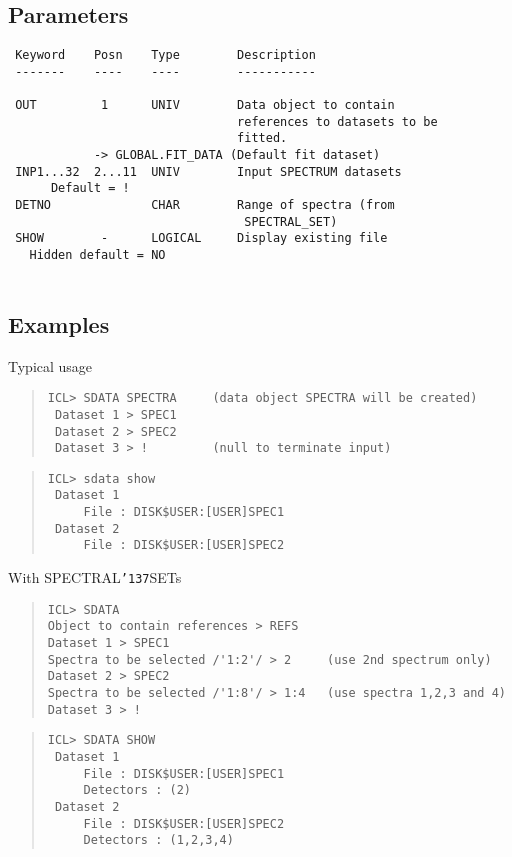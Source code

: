 \documentclass{book}
\renewcommand{\_}{{\tt\char'137}}     %
\begin{document}
\subsection{Parameters}
\begin{verbatim}
 Keyword    Posn    Type        Description
 -------    ----    ----        -----------
 
 OUT         1      UNIV        Data object to contain
                                references to datasets to be
                                fitted.
            -> GLOBAL.FIT_DATA (Default fit dataset)
 INP1...32  2...11  UNIV        Input SPECTRUM datasets
      Default = !
 DETNO              CHAR        Range of spectra (from
                                 SPECTRAL_SET)
 SHOW        -      LOGICAL     Display existing file
   Hidden default = NO
 
\end{verbatim}\subsection{Examples}
Typical usage
\begin{quote}\begin{verbatim}
ICL> SDATA SPECTRA     (data object SPECTRA will be created)
 Dataset 1 > SPEC1
 Dataset 2 > SPEC2
 Dataset 3 > !         (null to terminate input)
\end{verbatim}\end{quote}
\begin{quote}\begin{verbatim}
ICL> sdata show
 Dataset 1
     File : DISK$USER:[USER]SPEC1
 Dataset 2
     File : DISK$USER:[USER]SPEC2
\end{verbatim}\end{quote}
With SPECTRAL\_SETs
\begin{quote}\begin{verbatim}
ICL> SDATA
Object to contain references > REFS
Dataset 1 > SPEC1
Spectra to be selected /'1:2'/ > 2     (use 2nd spectrum only)
Dataset 2 > SPEC2
Spectra to be selected /'1:8'/ > 1:4   (use spectra 1,2,3 and 4)
Dataset 3 > !
\end{verbatim}\end{quote}
\begin{quote}\begin{verbatim}
ICL> SDATA SHOW
 Dataset 1
     File : DISK$USER:[USER]SPEC1
     Detectors : (2)
 Dataset 2
     File : DISK$USER:[USER]SPEC2
     Detectors : (1,2,3,4)
\end{verbatim}\end{quote}
\end{document}
